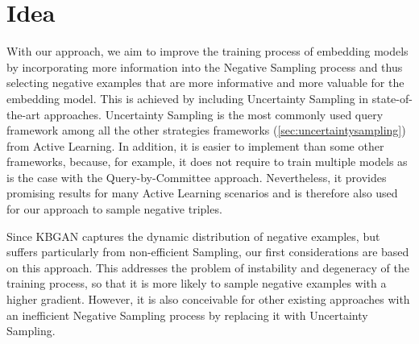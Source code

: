 
\section{Idea} \label{sec:idea}
With our approach, we aim to improve the training process of embedding models by incorporating more information into the Negative Sampling process and thus selecting negative examples that are more informative and more valuable for the embedding model.
This is achieved by including Uncertainty Sampling in state-of-the-art approaches.
Uncertainty Sampling is the most commonly used query framework among all the other strategies frameworks (\autoref{sec:uncertaintysampling}) from Active Learning.
In addition, it is easier to implement than some other frameworks, because, for example, it does not require to train multiple models as is the case with the Query-by-Committee approach.
Nevertheless, it provides promising results for many Active Learning scenarios and is therefore also used for our approach to sample negative triples.

Since \ac{KBGAN} captures the dynamic distribution of negative examples, but suffers particularly from non-efficient Sampling, our first considerations are based on this approach.
This addresses the problem of instability and degeneracy of the training process, so that it is more likely to sample negative examples with a higher gradient.
However, it is also conceivable for other existing approaches with an inefficient Negative Sampling process by replacing it with Uncertainty Sampling.

